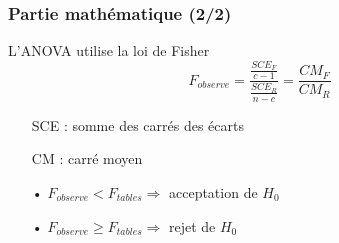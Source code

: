 \documentclass{beamer}
\begin{document}
\begin{frame}
\frametitle{Partie mathématique (2/2)}

\begin{block}{L'ANOVA utilise la loi de Fisher}
\[ F_{observe} = \frac{\frac{SCE_F}{c-1}}{\frac{SCE_R}{n-c}}=\frac{CM_F}{CM_R} \]
\end{block}

\begin{itemize}
\item[] SCE : somme des carrés des écarts \\
\item[] CM : carré moyen \\
\end{itemize}

\begin{itemize}
\item[•] $F_{observe} < F_{tables} \Rightarrow $ acceptation de $H_0$
\item[•] $F_{observe} \ge F_{tables} \Rightarrow $ rejet de $H_0$
\end{itemize}

\end{frame}
\end{document}
